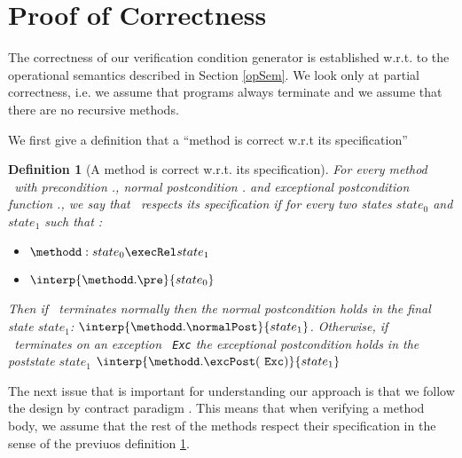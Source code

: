 

\newcommand{\state}[1]{ \tau_{#1} } 
\newcommand{\straightBraces}[1]{ \texttt{ (} #1 \texttt{ )} }

\newcommand{\tbc}{\textit{TBC}}

\newtheorem{defCorrect}{Definition}[section]

\newtheorem{lemma_1}{Lemma}[section] 
\newtheorem{lemma0}{Lemma}
\newtheorem{lemma1}[lemma0]{Lemma}
\newtheorem{vcGenCorrect}[lemma0]{Theorem}






\section{Proof of Correctness } \label{proof}

The correctness of our verification  condition generator is established w.r.t.
to the operational semantics described in Section \ref{opSem}. We look only at
 partial correctness, i.e. we assume that programs always terminate and we assume that there are no recursive methods.

We first give a definition that a ``method is correct w.r.t its specification''

\begin{defCorrect}[A method is correct w.r.t. its specification] \label{defCorrect}
For every method \methodd \ with precondition \methodd.\pre, normal postcondition \methodd.\normalPost
and exceptional postcondition function \methodd.\excPostSpec, we say that \methodd \ respects its specification if 
for every two states $state_0$ and $state_1$ such that :
\begin{itemize}
      \item   $\methodd : state_0 \execRel state_1   $
      \item   $ \interp{\methodd.\pre }{ state_0 }$
\end{itemize}
Then if \methodd \ terminates normally then the normal postcondition holds in the final state $state_1 $:  $\interp{\methodd.\normalPost}{state_1}$. 
Otherwise, if  \methodd \ terminates on an exception \mbox{ \rm \texttt{Exc}} the exceptional postcondition holds in the poststate $state_1 $
$ \interp{\methodd.\excPost(  \mbox{ \rm \texttt{Exc}} )}{state_1} $
\end{defCorrect}
 
 The next issue that is important for understanding our approach is that we follow the design by 
 contract paradigm \cite{M97oos}. This means that when verifying a method body, we assume that the
 rest of the methods respect their
 specification in the sense of the previuos definition \ref{defCorrect}.


